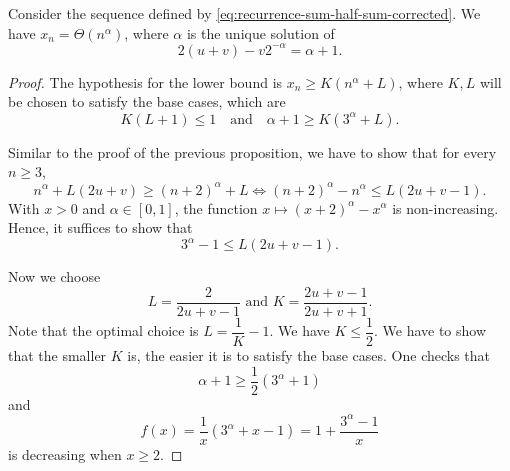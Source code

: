 \begin{proposition}
  Consider the sequence defined by \eqref{eq:recurrence-sum-half-sum-corrected}. We have $x_n = \Theta(n^{\alpha})$, where $\alpha$ is the unique solution of
  $$2(u+v) - v2^{-\alpha} = \alpha+1.$$
\end{proposition}

\begin{proof}
  The hypothesis for the lower bound is $x_n \ge K(n^\alpha + L)$, where $K,L$ will be chosen to satisfy the base cases, which are
  $$K(L+1) \le 1 \quad \text{and} \quad \alpha+1 \ge K(3^\alpha + L).$$

  Similar to the proof of the previous proposition, we have to show that for every $n\ge 3$,
  $$n^{\alpha} + L(2u+v) \ge (n+2)^\alpha + L \iff (n+2)^\alpha - n^\alpha \le L(2u+v-1).$$
  With $x > 0$ and $\alpha\in [0,1]$, the function $x\mapsto (x+2)^\alpha - x^\alpha$ is non-increasing. Hence, it suffices to show that
  $$3^\alpha - 1 \le L(2u+v-1).$$

  Now we choose
  $$L=\dfrac{2}{2u+v-1} \text{ and } K=\dfrac{2u+v-1}{2u+v+1}.$$ Note that the optimal choice is $L=\dfrac{1}{K}-1$. We have $K\le \dfrac{1}{2}$. We have to show that the smaller $K$ is, the easier it is to satisfy the base cases. One checks that
  $$\alpha+1 \ge \dfrac{1}{2}(3^\alpha + 1)$$
  and
  $$f(x) = \dfrac{1}{x}(3^\alpha + x-1) = 1 + \dfrac{3^\alpha - 1}{x}$$
  is decreasing when $x\ge 2$.
\end{proof}